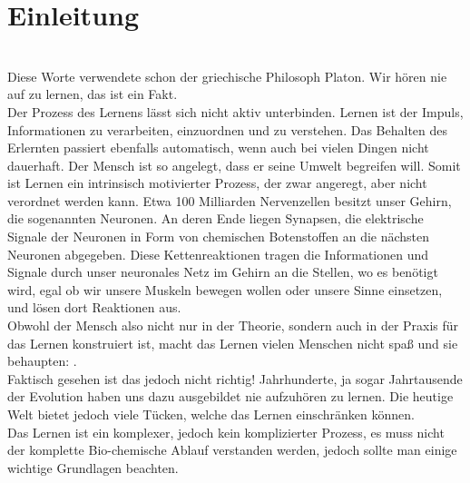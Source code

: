 \section{Einleitung}
\\
Diese Worte verwendete schon der griechische Philosoph Platon. Wir hören nie auf zu lernen, das ist ein Fakt. \\

\noindent
Der Prozess des Lernens lässt sich nicht aktiv unterbinden. Lernen ist der Impuls, Informationen zu verarbeiten, einzuordnen und zu verstehen. Das Behalten des Erlernten passiert ebenfalls automatisch, wenn auch bei vielen Dingen nicht dauerhaft. Der Mensch ist so angelegt, dass er seine Umwelt begreifen will. Somit ist Lernen ein intrinsisch motivierter Prozess, der zwar angeregt, aber nicht verordnet werden kann.
Etwa 100 Milliarden Nervenzellen besitzt unser Gehirn, die sogenannten Neuronen. An deren Ende liegen Synapsen, die elektrische Signale der Neuronen in Form von chemischen Botenstoffen an die nächsten Neuronen abgegeben. Diese Kettenreaktionen tragen die Informationen und Signale durch unser neuronales Netz im Gehirn an die Stellen, wo es benötigt wird, egal ob wir unsere Muskeln bewegen wollen oder unsere Sinne einsetzen, und lösen dort Reaktionen aus. \\

\noindent
Obwohl der Mensch also nicht nur in der Theorie, sondern auch in der Praxis für das Lernen konstruiert ist, macht das Lernen vielen Menschen nicht spaß und sie behaupten: . \\

\noindent
Faktisch gesehen ist das jedoch nicht richtig! Jahrhunderte, ja sogar Jahrtausende der Evolution haben uns dazu ausgebildet nie aufzuhören zu lernen. Die heutige Welt bietet jedoch viele Tücken, welche das Lernen einschränken können. \\

\noindent
Das Lernen ist ein komplexer, jedoch kein komplizierter Prozess, es muss nicht der komplette Bio-chemische Ablauf verstanden werden, jedoch sollte man einige wichtige Grundlagen beachten.